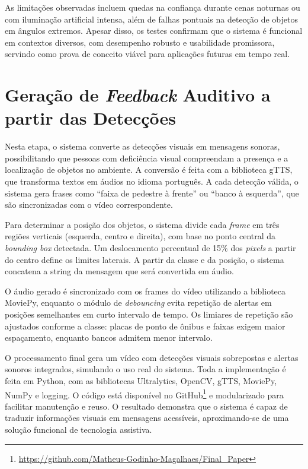 As limitações observadas incluem quedas na confiança durante cenas noturnas ou com iluminação artificial intensa, além de falhas pontuais na detecção de objetos em ângulos extremos. Apesar disso, os testes confirmam que o sistema é funcional em contextos diversos, com desempenho robusto e usabilidade promissora, servindo como prova de conceito viável para aplicações futuras em tempo real.

\section{\textbf{Geração de \textit{Feedback} Auditivo a partir das Detecções}}

Nesta etapa, o sistema converte as detecções visuais em mensagens sonoras, possibilitando que pessoas com deficiência visual compreendam a presença e a localização de objetos no ambiente. A conversão é feita com a biblioteca gTTS, que transforma textos em áudios no idioma português. A cada detecção válida, o sistema gera frases como “faixa de pedestre à frente” ou “banco à esquerda”, que são sincronizadas com o vídeo correspondente.

Para determinar a posição dos objetos, o sistema divide cada \textit{frame} em três regiões verticais (esquerda, centro e direita), com base no ponto central da \textit{bounding box} detectada. Um deslocamento percentual de 15\% dos \textit{pixels} a partir do centro define os limites laterais. A partir da classe e da posição, o sistema concatena a string da mensagem que será convertida em áudio.

O áudio gerado é sincronizado com os frames do vídeo utilizando a biblioteca MoviePy, enquanto o módulo de \textit{debouncing} evita repetição de alertas em posições semelhantes em curto intervalo de tempo. Os limiares de repetição são ajustados conforme a classe: placas de ponto de ônibus e faixas exigem maior espaçamento, enquanto bancos admitem menor intervalo.

O processamento final gera um vídeo com detecções visuais sobrepostas e alertas sonoros integrados, simulando o uso real do sistema. Toda a implementação é feita em Python, com as bibliotecas Ultralytics, OpenCV, gTTS, MoviePy, NumPy e logging. O código está disponível no GitHub\footnote{\url{https://github.com/Matheus-Godinho-Magalhaes/Final_Paper}} e modularizado para facilitar manutenção e reuso. O resultado demonstra que o sistema é capaz de traduzir informações visuais em mensagens acessíveis, aproximando-se de uma solução funcional de tecnologia assistiva.

